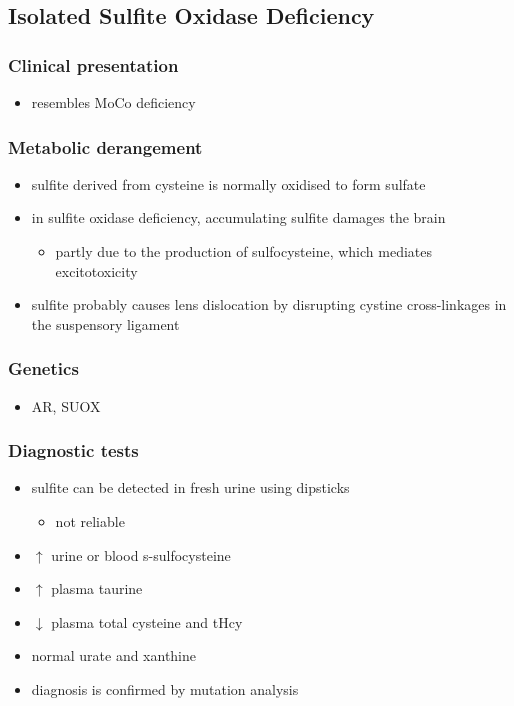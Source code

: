 \documentclass{scrartcl}
\begin{document}
\subsection{Isolated Sulfite Oxidase Deficiency}
\label{sec:org0ffcb7c}
\subsubsection{Clinical presentation}
\label{sec:org4d334e3}
\begin{itemize}
\item resembles MoCo deficiency
\end{itemize}
\subsubsection{Metabolic derangement}
\label{sec:orgdf5d2fa}
\begin{itemize}
\item sulfite derived from cysteine is normally oxidised to form
sulfate
\item in sulfite oxidase deficiency, accumulating sulfite damages the brain
\begin{itemize}
\item partly due to the production of sulfocysteine, which
mediates excitotoxicity
\end{itemize}
\item sulfite probably causes lens dislocation by disrupting cystine
cross-linkages in the suspensory ligament
\end{itemize}

\subsubsection{Genetics}
\label{sec:orge05677c}
\begin{itemize}
\item AR, SUOX
\end{itemize}

\subsubsection{Diagnostic tests}
\label{sec:org1652097}
\begin{itemize}
\item sulfite can be detected in fresh urine using dipsticks
\begin{itemize}
\item not reliable
\end{itemize}
\item \(\uparrow\) urine or blood s-sulfocysteine
\item \(\uparrow\) plasma taurine
\item \(\downarrow\) plasma total cysteine and tHcy
\item normal urate and xanthine
\item diagnosis is confirmed by mutation analysis
\end{itemize}
\end{document}
